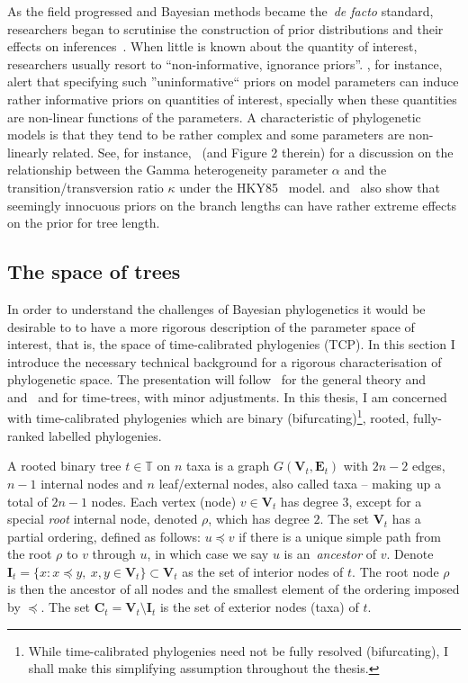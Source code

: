 As the field progressed and Bayesian methods became the~\textit{de facto} standard, researchers began to scrutinise the construction of prior distributions and their effects 
on inferences~\citep{Huelsenbeck2002,Yang2005,Alfaro2006}.
When little is known about the quantity of interest, researchers usually resort to ``non-informative, ignorance priors''.
\cite{Seaman2012}, for instance, alert that specifying such ''uninformative`` priors on model parameters can induce rather informative priors on quantities of interest, specially when these quantities are non-linear functions of the parameters.
A characteristic of phylogenetic models is that they tend to be rather complex and some parameters are non-linearly related.
See, for instance,~\cite{Yang1996} (and Figure 2 therein) for a discussion on the relationship between the Gamma heterogeneity parameter $\alpha$ and the transition/transversion ratio $\kappa$ under the HKY85~\citep{Hasegawa1985} model.
\cite{Rannala2012} and~\cite{Wang2014} also show that seemingly innocuous priors on the branch lengths can have rather extreme effects on the prior for tree length.

\subsection{The space of trees}
\label{sec:tree_space}

In order to understand the challenges of Bayesian phylogenetics it would be desirable to to have a more rigorous description of the parameter space of interest, that is, the space of time-calibrated phylogenies (TCP).
In this section I introduce the necessary technical background for a rigorous characterisation of phylogenetic space.
The presentation will follow~\cite{Semple2003} for the general theory and~\cite{Drummond2002} and~\cite{Gavryushkina2013} and for time-trees, with minor adjustments.
In this thesis, I am concerned with time-calibrated phylogenies which are binary (bifurcating)\footnote{While time-calibrated phylogenies need not be fully resolved (bifurcating), I shall make this simplifying assumption throughout the thesis.}, rooted, fully-ranked labelled phylogenies.

A rooted binary tree $t \in \mathbb{T}$ on $n$ taxa is a graph $G(\boldsymbol V_t, \boldsymbol E_t)$ with $2n-2$ edges, $n-1$ internal nodes and $n$ leaf/external nodes, also called taxa -- making up a total of $2n-1$ nodes.
Each vertex (node) $v \in \boldsymbol V_t$ has degree $3$, except for a special \textit{root} internal node, denoted $\rho$, which has degree $2$.
The set $\boldsymbol V_t$ has a partial ordering, defined as follows: $u \preceq v$ if there is a unique simple path from the root $\rho$ to $v$ through $u$, in which case we say $u$ is an~\textit{ancestor} of $v$.
Denote $\boldsymbol I_t = \{ x:  x \preceq y, \: x,y \in \boldsymbol V_t \} \subset \boldsymbol V_t $ as the set of interior nodes of $t$.
The root node $\rho$ is then the ancestor of all nodes and the smallest element of the ordering imposed by $\preceq$.
The set $\boldsymbol C_t = \boldsymbol V_t \setminus \boldsymbol I_t$ is the set of exterior nodes (taxa) of $t$.

